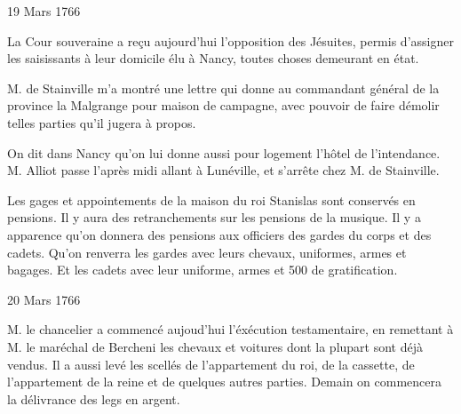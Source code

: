                      \begin{diary}{19 Mars 1766}{}


                           La Cour souveraine a reçu aujourd'hui l'opposition
                           des Jésuites, permis d'assigner
                           les saisissants
                           à leur domicile élu à Nancy,
                           toutes choses
                           demeurant en état. \bigskip



                           M. de Stainville m'a montré une
                           lettre qui
                           donne au commandant général de
                              la province
                           la Malgrange pour maison de
                           campagne,
                           avec pouvoir de faire démolir telles parties
                           qu'il jugera à propos. \bigskip


                         On dit dans Nancy qu'on lui donne aussi
                           pour logement l'hôtel de
                              l'intendance.
                           M. Alliot passe l'après midi
                           allant à
                           Lunéville, et s'arrête chez
                           M. de Stainville. \bigskip


                         Les gages et appointements de la maison du
                           roi Stanislas sont conservés
                           en pensions.
                           Il y aura des retranchements sur les pensions
                           de la musique. Il y a apparence qu'on donnera
                           des pensions aux officiers des gardes du corps
                           et des cadets. Qu'on
                           renverra les gardes avec
                           leurs chevaux, uniformes, armes et bagages.
                           Et les cadets avec leur uniforme, armes et
                           500 de gratification. \bigskip


                     \end{diary}

                     \begin{diary}{20 Mars 1766}{}


                           M. le chancelier a commencé
                           aujoud'hui
                           l'éxécution testamentaire, en remettant à
                           M. le maréchal de Bercheni les chevaux et
                           voitures dont la plupart sont déjà vendus.
                           Il a aussi levé les scellés de l'appartement
                           du roi, de la cassette, de l'appartement de
                           la reine et de
                           quelques autres parties. Demain
                           on commencera la délivrance des legs en argent. \bigskip


                     \end{diary}

